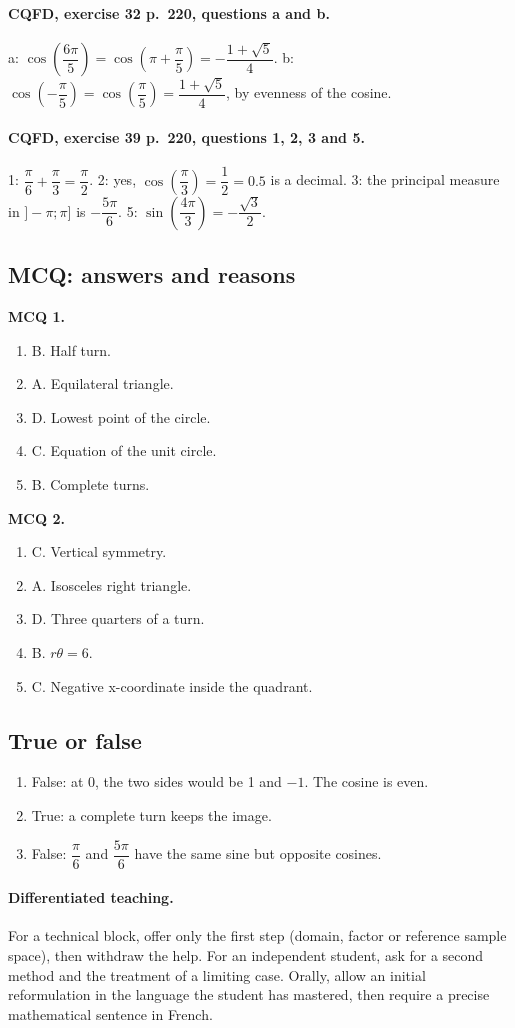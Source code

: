 \paragraph{CQFD, exercise 32 p.~220, questions a and b.} a: $\cos(\dfrac{6\pi}5)=\cos(\pi+\dfrac\pi5)=-\dfrac{1+\sqrt5}{4}$. b: $\cos(-\dfrac\pi5)=\cos(\dfrac\pi5)=\dfrac{1+\sqrt5}{4}$, by evenness of the cosine.
\paragraph{CQFD, exercise 39 p.~220, questions 1, 2, 3 and 5.} 1: $\dfrac\pi6+\dfrac\pi3=\dfrac\pi2$. 2: yes, $\cos(\dfrac\pi3)=\dfrac12=0.5$ is a decimal. 3: the principal measure in $]-\pi;\pi]$ is $-\dfrac{5\pi}6$. 5: $\sin(\dfrac{4\pi}3)=-\dfrac{\sqrt3}2$.
\subsection*{MCQ: answers and reasons}
\textbf{MCQ 1.}
\begin{enumerate}
\item B. Half turn.
\item A. Equilateral triangle.
\item D. Lowest point of the circle.
\item C. Equation of the unit circle.
\item B. Complete turns.
\end{enumerate}
\textbf{MCQ 2.}
\begin{enumerate}
\item C. Vertical symmetry.
\item A. Isosceles right triangle.
\item D. Three quarters of a turn.
\item B. $r\theta=6$.
\item C. Negative x-coordinate inside the quadrant.
\end{enumerate}
\subsection*{True or false}
\begin{enumerate}
\item False: at 0, the two sides would be 1 and $-1$. The cosine is even.
\item True: a complete turn keeps the image.
\item False: $\dfrac{\pi}{6}$ and $\dfrac{5\pi}{6}$ have the same sine but opposite cosines.
\end{enumerate}
\paragraph{Differentiated teaching.} For a technical block, offer only the first step (domain, factor or reference sample space), then withdraw the help. For an independent student, ask for a second method and the treatment of a limiting case. Orally, allow an initial reformulation in the language the student has mastered, then require a precise mathematical sentence in French.
